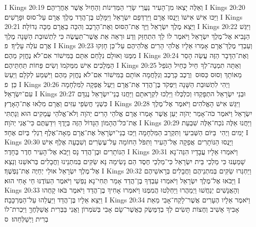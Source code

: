 I Kings 20:19	וְאֵלֶּה יָצְאוּ מִן־הָעִיר נַעֲרֵי שָׂרֵי הַמְּדִינוֹת וְהַחַיִל אֲשֶׁר אַחֲרֵיהֶם׃
I Kings 20:20	וַיַּכּוּ אִישׁ אִישׁוֹ וַיָּנֻסוּ אֲרָם וַיִּרְדְּפֵם יִשְׂרָאֵל וַיִּמָּלֵט בֶּן־הֲדַד מֶלֶךְ אֲרָם עַל־סוּס וּפָרָשִׁים׃
I Kings 20:21	וַיֵּצֵא מֶלֶךְ יִשְׂרָאֵל וַיַּךְ אֶת־הַסּוּס וְאֶת־הָרָכֶב וְהִכָּה בַאֲרָם מַכָּה גְדוֹלָה׃
I Kings 20:22	וַיִּגַּשׁ הַנָּבִיא אֶל־מֶלֶךְ יִשְׂרָאֵל וַיֹּאמֶר לוֹ לֵךְ הִתְחַזַּק וְדַע וּרְאֵה אֵת אֲשֶׁר־תַּעֲשֶׂה כִּי לִתְשׁוּבַת הַשָּׁנָה מֶלֶךְ אֲרָם עֹלֶה עָלֶיךָ׃ {פ}
I Kings 20:23	וְעַבְדֵי מֶלֶךְ־אֲרָם אָמְרוּ אֵלָיו אֱלֹהֵי הָרִים אֱלֹהֵיהֶם עַל־כֵּן חָזְקוּ מִמֶּנּוּ וְאוּלָם נִלָּחֵם אִתָּם בַּמִּישׁוֹר אִם־לֹא נֶחֱזַק מֵהֶם׃
I Kings 20:24	וְאֶת־הַדָּבָר הַזֶּה עֲשֵׂה הָסֵר הַמְּלָכִים אִישׁ מִמְּקֹמוֹ וְשִׂים פַּחוֹת תַּחְתֵּיהֶם׃
I Kings 20:25	וְאַתָּה תִמְנֶה־לְךָ  חַיִל כַּחַיִל הַנֹּפֵל מֵאוֹתָךְ וְסוּס כַּסּוּס  וְרֶכֶב כָּרֶכֶב וְנִלָּחֲמָה אוֹתָם בַּמִּישׁוֹר אִם־לֹא נֶחֱזַק מֵהֶם וַיִּשְׁמַע לְקֹלָם וַיַּעַשׂ כֵּן׃ {פ}
I Kings 20:26	וַיְהִי לִתְשׁוּבַת הַשָּׁנָה וַיִּפְקֹד בֶּן־הֲדַד אֶת־אֲרָם וַיַּעַל אֲפֵקָה לַמִּלְחָמָה עִם־יִשְׂרָאֵל׃
I Kings 20:27	וּבְנֵי יִשְׂרָאֵל התְפָּקְדוּ וְכלְכְּלוּ וַיֵּלְכוּ לִקְרָאתָם וַיַּחֲנוּ בְנֵי־יִשְׂרָאֵל נֶגְדָּם כִּשְׁנֵי חֲשִׂפֵי עִזִּים וַאֲרָם מִלְאוּ אֶת־הָאָרֶץ׃
I Kings 20:28	וַיִּגַּשׁ אִישׁ הָאֱלֹהִים וַיֹּאמֶר אֶל־מֶלֶךְ יִשְׂרָאֵל וַיֹּאמֶר כֹּה־אָמַר יְהֹוָה יַעַן אֲשֶׁר אָמְרוּ אֲרָם אֱלֹהֵי הָרִים יְהֹוָה וְלֹא־אֱלֹהֵי עֲמָקִים הוּא וְנָתַתִּי אֶת־כּל־הֶהָמוֹן הַגָּדוֹל הַזֶּה בְּיָדֶךָ וִידַעְתֶּם כִּי־אֲנִי יְהֹוָה׃
I Kings 20:29	וַיַּחֲנוּ אֵלֶּה נֹכַח־אֵלֶּה שִׁבְעַת יָמִים וַיְהִי  בַּיּוֹם הַשְּׁבִיעִי וַתִּקְרַב הַמִּלְחָמָה וַיַּכּוּ בְנֵי־יִשְׂרָאֵל אֶת־אֲרָם מֵאָה־אֶלֶף רַגְלִי בְּיוֹם אֶחָד׃
I Kings 20:30	וַיָּנֻסוּ הַנּוֹתָרִים  אֲפֵקָה אֶל־הָעִיר וַתִּפֹּל הַחוֹמָה עַל־עֶשְׂרִים וְשִׁבְעָה אֶלֶף אִישׁ הַנּוֹתָרִים וּבֶן־הֲדַד נָס וַיָּבֹא אֶל־הָעִיר חֶדֶר בְּחָדֶר׃
I Kings 20:31	וַיֹּאמְרוּ אֵלָיו עֲבָדָיו הִנֵּה־נָא שָׁמַעְנוּ כִּי מַלְכֵי בֵּית יִשְׂרָאֵל כִּי־מַלְכֵי חֶסֶד הֵם נָשִׂימָה נָּא שַׂקִּים בְּמתְנֵינוּ וַחֲבָלִים בְּרֹאשֵׁנוּ וְנֵצֵא אֶל־מֶלֶךְ יִשְׂרָאֵל אוּלַי יְחַיֶּה אֶת־נַפְשֶׁךָ׃
I Kings 20:32	וַיַּחְגְּרוּ שַׂקִּים בְּמתְנֵיהֶם וַחֲבָלִים בְּרָאשֵׁיהֶם וַיָּבֹאוּ אֶל־מֶלֶךְ יִשְׂרָאֵל וַיֹּאמְרוּ עַבְדְּךָ בֶן־הֲדַד אָמַר תְּחִי־נָא נַפְשִׁי וַיֹּאמֶר הַעוֹדֶנּוּ חַי אָחִי הוּא׃
I Kings 20:33	וְהָאֲנָשִׁים יְנַחֲשׁוּ וַיְמַהֲרוּ וַיַּחְלְטוּ הֲמִמֶּנּוּ וַיֹּאמְרוּ אָחִיךָ בֶן־הֲדַד וַיֹּאמֶר בֹּאוּ קָחֻהוּ וַיֵּצֵא אֵלָיו בֶּן־הֲדַד וַיַּעֲלֵהוּ עַל־הַמֶּרְכָּבָה׃
I Kings 20:34	וַיֹּאמֶר אֵלָיו הֶעָרִים אֲשֶׁר־לָקַח־אָבִי מֵאֵת אָבִיךָ אָשִׁיב וְחֻצוֹת תָּשִׂים לְךָ בְדַמֶּשֶׂק כַּאֲשֶׁר־שָׂם אָבִי בְּשֹׁמְרוֹן וַאֲנִי בַּבְּרִית אֲשַׁלְּחֶךָּ וַיִּכְרת־לוֹ בְרִית וַיְשַׁלְּחֵהוּ׃ {ס}        
